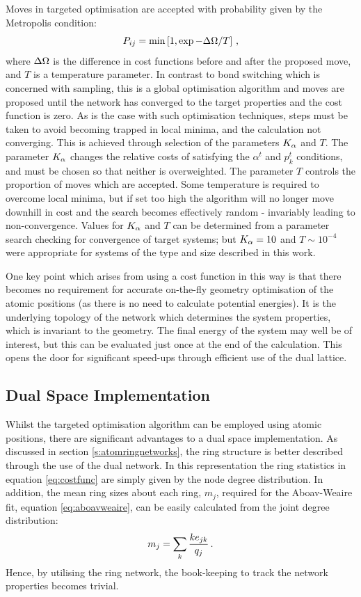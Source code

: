 Moves in targeted optimisation are accepted with probability given by the Metropolis condition:
\begin{equation}
	P_{ij}=\min\left[1,\exp{-\Delta\Omega/T}\right]\,,
\end{equation}
where $\Delta\Omega$ is the difference in cost functions before and after the proposed move, and $T$ is a temperature parameter. 
In contrast to bond switching which is concerned with sampling, this is a global optimisation algorithm and moves are proposed until the network has converged to the target properties and the cost function is zero.
As is the case with such optimisation techniques, steps must be taken to avoid becoming trapped in local minima, and the calculation not converging. 
This is achieved through selection of the parameters $K_\alpha$ and $T$. 
The parameter $K_\alpha$ changes the relative costs of satisfying the $\alpha^t$ and $p_k^t$ conditions, and must be chosen so that neither is overweighted. The parameter $T$ controls the proportion of moves which are accepted. 
Some temperature is required to overcome local minima, but if set too high the algorithm will no longer move downhill in cost and the search becomes effectively random \-- invariably leading to non\--convergence. 
Values for $K_\alpha$ and $T$ can be determined from a parameter search checking for convergence of target systems; but $K_\alpha=10$ and $T\sim 10^{-4}$ were appropriate for systems of the type and size described in this work. 

One key point which arises from using a cost function in this way is that there becomes no requirement for accurate on\--the\--fly geometry optimisation of the atomic positions (as there is no need to calculate potential energies).
It is the underlying topology of the network which determines the system properties, which is invariant to the geometry.
The final energy of the system may well be of interest, but this can be evaluated just once at the end of the calculation.
This opens the door for significant speed\--ups through efficient use of the dual lattice.

\subsection{Dual Space Implementation}

Whilst the targeted optimisation algorithm can be employed using atomic positions, there are significant advantages to a dual space implementation.
As discussed in section \ref{s:atomringnetworks}, the ring structure is better described through the use of the dual network. 
In this representation the ring statistics in equation \eqref{eq:costfunc} are simply given by the node degree distribution. 
In addition, the mean ring sizes about each ring, $m_j$, required for the Aboav\--Weaire fit, equation \eqref{eq:aboavweaire}, can be easily calculated from the joint degree distribution:
\begin{equation}
	m_j = \sum\limits_k \frac{ke_{jk}}{q_j}\,.
\end{equation}
Hence, by utilising the ring network, the book\--keeping to track the network properties becomes trivial.

